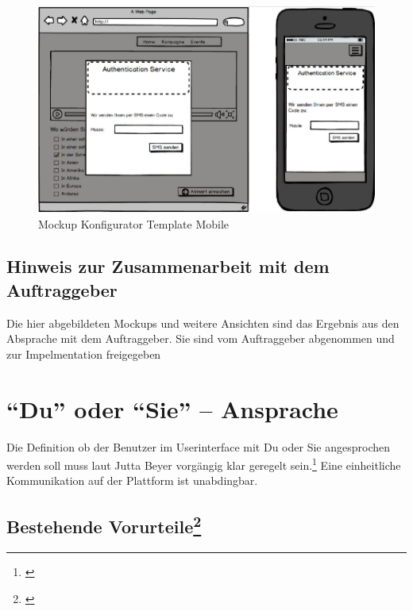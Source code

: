 \begin{figure}[htbp]
\centering
\includegraphics{images/mockups/authenticationlightbox.jpg}
\caption{Mockup Konfigurator Template Mobile}
\end{figure}

\subsection{Hinweis zur Zusammenarbeit mit dem
Auftraggeber}\label{hinweis-zur-zusammenarbeit-mit-dem-auftraggeber}

Die hier abgebildeten Mockups und weitere Ansichten sind das Ergebnis
aus den Absprache mit dem Auftraggeber. Sie sind vom Auftraggeber
abgenommen und zur Impelmentation freigegeben

\newpage

\section{\texorpdfstring{``Du'' oder ``Sie'' --
Ansprache}{Du oder Sie -- Ansprache}}\label{du-oder-sie-ansprache}

Die Definition ob der Benutzer im Userinterface mit Du oder Sie
angesprochen werden soll muss laut Jutta Beyer vorgängig klar geregelt
sein.\footnote{\autocite{dusieansprache}} Eine einheitliche
Kommunikation auf der Plattform ist unabdingbar.

\subsection[Bestehende Vorurteile]{\texorpdfstring{Bestehende
Vorurteile\footnote{\autocite{dusieansprache}}}{Bestehende Vorurteile}}\label{bestehende-vorurteiledusieansprache}

